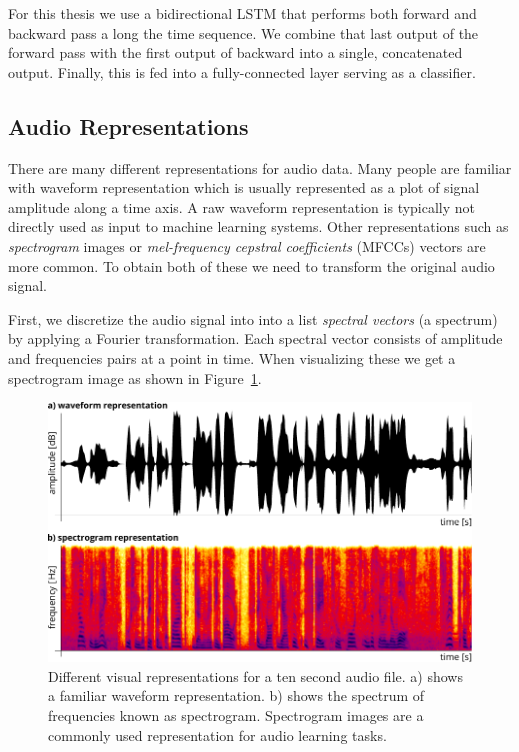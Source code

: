 	For this thesis we use a bidirectional LSTM that performs both forward and backward pass a long the time sequence. We combine that last output of the forward pass with the first output of backward into a single, concatenated output. Finally, this is fed into a fully-connected layer serving as a classifier.
	
\subsection{Audio Representations}
There are many different representations for audio data. Many people are familiar with waveform representation which is usually represented as a plot of signal amplitude along a time axis. A raw waveform representation is typically not directly used as input to machine learning systems.
Other representations such as \emph{spectrogram} images or \emph{mel-frequency cepstral coefficients} (MFCCs) vectors are more common. To obtain both of these we need to transform the original audio signal.

First, we discretize the audio signal into into a list \emph{spectral vectors} (a spectrum) by applying a Fourier transformation. Each spectral vector consists of amplitude and frequencies pairs at a point in time. When visualizing these we get a spectrogram image as shown in Figure~\ref{fig:waveform}. 
%
	\begin{figure}[tp]
  		\centering
    	\includegraphics{img/waveform.pdf}
    	\caption{Different visual representations for a ten second audio file. a) shows a familiar waveform representation. b) shows the spectrum of frequencies known as spectrogram. Spectrogram images  are a commonly used representation for audio learning tasks.}
    	\label{fig:waveform}
	\end{figure}
%

